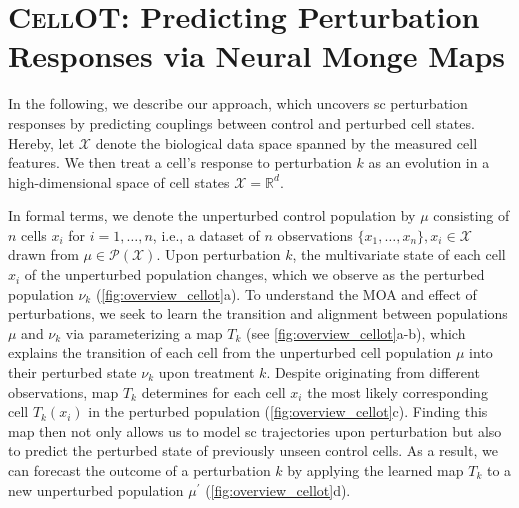 \section{\textsc{CellOT}: Predicting Perturbation Responses via Neural Monge Maps}

In the following, we describe our approach, which uncovers \acrlong{sc} perturbation responses by predicting couplings between control and perturbed cell states.
Hereby, let $\mathcal{X}$ denote the biological data space spanned by the measured cell features. We then treat a cell's response to perturbation $k$ as an evolution in a high-dimensional space of cell states $\mathcal{X} = \mathbb{R}^d$.

In formal terms, we denote the unperturbed control population by $\mu$ consisting of $n$ cells $x_i$ for $i = 1, \dots, n$, i.e., a dataset of $n$ observations $\{ x_1, \dots, x_n \}, x_i \in \mathcal{X}$ drawn from $\mu \in \mathcal{P}(\mathcal{X})$. Upon perturbation $k$, the multivariate state of each cell $x_i$ of the unperturbed population changes, which we observe as the perturbed population $\nu_k$ (\cref{fig:overview_cellot}a).
To understand the \acrlong{MOA} and effect of perturbations, we seek to learn the transition and alignment between populations $\mu$ and $\nu_k$ via parameterizing a map $T_k$ (see \cref{fig:overview_cellot}a-b), which explains the transition of each cell from the unperturbed cell population $\mu$ into their perturbed state $\nu_k$ upon treatment $k$.
Despite originating from  different observations, map $T_k$ determines for each cell $x_i$ the most likely corresponding cell $T_k(x_i)$ in the perturbed population (\cref{fig:overview_cellot}c).
Finding this map then not only allows us to model \acrlong{sc} trajectories upon perturbation but also to predict the perturbed state of previously unseen control cells. As a result, we can forecast the outcome of a perturbation $k$  by applying the learned map $T_k$ to a new unperturbed population $\mu^\prime$ (\cref{fig:overview_cellot}d).


